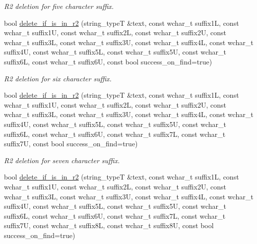 \begin{DoxyCompactItemize}
\begin{DoxyCompactList}\small\item\em R2 deletion for five character suffix. \end{DoxyCompactList}\item 
\hypertarget{group___stemming_ga95aca52d1f624638130a9d1c66570edb}{bool \hyperlink{group___stemming_ga95aca52d1f624638130a9d1c66570edb}{delete\-\_\-if\-\_\-is\-\_\-in\-\_\-r2} (string\-\_\-type\-T \&text, const wchar\-\_\-t suffix1\-L, const wchar\-\_\-t suffix1\-U, const wchar\-\_\-t suffix2\-L, const wchar\-\_\-t suffix2\-U, const wchar\-\_\-t suffix3\-L, const wchar\-\_\-t suffix3\-U, const wchar\-\_\-t suffix4\-L, const wchar\-\_\-t suffix4\-U, const wchar\-\_\-t suffix5\-L, const wchar\-\_\-t suffix5\-U, const wchar\-\_\-t suffix6\-L, const wchar\-\_\-t suffix6\-U, const bool success\-\_\-on\-\_\-find=true)}\label{group___stemming_ga95aca52d1f624638130a9d1c66570edb}

\begin{DoxyCompactList}\small\item\em R2 deletion for six character suffix. \end{DoxyCompactList}\item 
\hypertarget{group___stemming_ga9542e67a264c728cfb636767dc75a07c}{bool \hyperlink{group___stemming_ga9542e67a264c728cfb636767dc75a07c}{delete\-\_\-if\-\_\-is\-\_\-in\-\_\-r2} (string\-\_\-type\-T \&text, const wchar\-\_\-t suffix1\-L, const wchar\-\_\-t suffix1\-U, const wchar\-\_\-t suffix2\-L, const wchar\-\_\-t suffix2\-U, const wchar\-\_\-t suffix3\-L, const wchar\-\_\-t suffix3\-U, const wchar\-\_\-t suffix4\-L, const wchar\-\_\-t suffix4\-U, const wchar\-\_\-t suffix5\-L, const wchar\-\_\-t suffix5\-U, const wchar\-\_\-t suffix6\-L, const wchar\-\_\-t suffix6\-U, const wchar\-\_\-t suffix7\-L, const wchar\-\_\-t suffix7\-U, const bool success\-\_\-on\-\_\-find=true)}\label{group___stemming_ga9542e67a264c728cfb636767dc75a07c}

\begin{DoxyCompactList}\small\item\em R2 deletion for seven character suffix. \end{DoxyCompactList}\item 
\hypertarget{group___stemming_ga9bbc2192839ce8ebcf88d0220cfa2441}{bool \hyperlink{group___stemming_ga9bbc2192839ce8ebcf88d0220cfa2441}{delete\-\_\-if\-\_\-is\-\_\-in\-\_\-r2} (string\-\_\-type\-T \&text, const wchar\-\_\-t suffix1\-L, const wchar\-\_\-t suffix1\-U, const wchar\-\_\-t suffix2\-L, const wchar\-\_\-t suffix2\-U, const wchar\-\_\-t suffix3\-L, const wchar\-\_\-t suffix3\-U, const wchar\-\_\-t suffix4\-L, const wchar\-\_\-t suffix4\-U, const wchar\-\_\-t suffix5\-L, const wchar\-\_\-t suffix5\-U, const wchar\-\_\-t suffix6\-L, const wchar\-\_\-t suffix6\-U, const wchar\-\_\-t suffix7\-L, const wchar\-\_\-t suffix7\-U, const wchar\-\_\-t suffix8\-L, const wchar\-\_\-t suffix8\-U, const bool success\-\_\-on\-\_\-find=true)}\label{group___stemming_ga9bbc2192839ce8ebcf88d0220cfa2441}


\end{DoxyCompactItemize}

